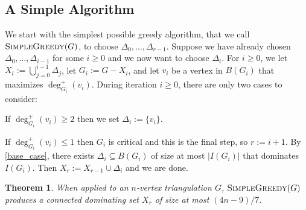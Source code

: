 \documentclass[a4paper,UKenglish, cleveref, autoref, thm-restate]{lipics-v2021}
\newtheorem{thm}{Theorem}
\begin{document}
\subsection{A Simple Algorithm} \label{warm_up}
We start with the simplest possible greedy algorithm, that we call $\textsc{SimpleGreedy}(G)$, to choose $\Delta_0,\ldots,\Delta_{r-1}$.  Suppose we have already chosen $\Delta_0,\ldots,\Delta_{i-1}$ for some $i\ge 0$ and we now want to choose $\Delta_i$. For $i \geq 0$, we let $X_i:=\bigcup_{j=0}^{i-1}\Delta_j$, let $G_i:=G-X_i$, and let $v_i$ be a vertex in $B(G_i)$ that maximizes $\deg^+_{G_i}(v_i)$.  During iteration $i\ge 0$, there are only two cases to consider:
\begin{enumerate}[{[}g1{]}]
    \item If $\deg^+_{G_i}(v_i)\ge 2$ then we set $\Delta_i := \{v_i\}$.
    \item If $\deg^+_{G_i}(v_i)\le 1$ then $G_i$ is critical and this is the final step, so $r:=i+1$.  By \cref{base_case}, there exists $\Delta_i\subseteq B(G_i)$ of size at most $|I(G_i)|$ that dominates $I(G_i)$. Then $X_r:=X_{r-1}\cup\Delta_{i}$ and we are done.
\end{enumerate}

\begin{thm}\label{simple_greedy}
  When applied to an $n$-vertex triangulation $G$,  $\textsc{SimpleGreedy}(G)$ produces a connected dominating set $X_r$ of size at most $(4n-9)/7$.
\end{thm}
\end{document}
